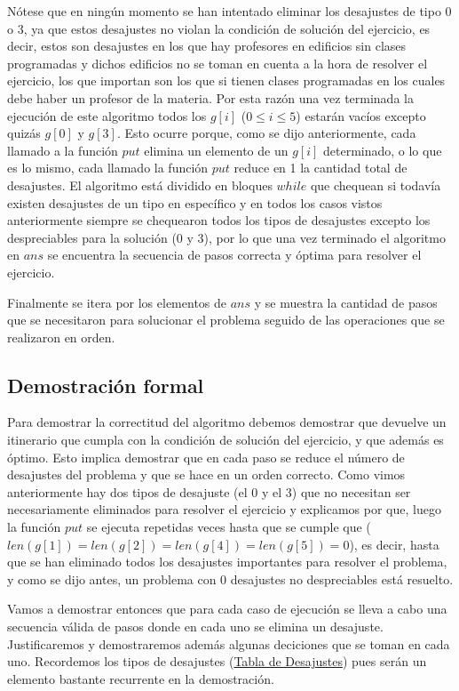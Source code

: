 \documentclass[11pt]{article}
\begin{document}
    Nótese que en ningún momento se han intentado eliminar los desajustes de tipo 0 o 3, ya que estos desajustes
    no violan la condición de solución del ejercicio, es decir, estos son desajustes en los que hay profesores en
    edificios sin clases programadas y dichos edificios no se toman en cuenta a la hora de resolver el ejercicio,
    los que importan son los que si tienen clases programadas en los cuales debe haber un profesor de la materia.
    Por esta razón una vez terminada la ejecución de este algoritmo todos los $g[i]$ ($0 \leq i \leq 5$) estarán
    vacíos excepto quizás $g[0]$ y $g[3]$. Esto ocurre porque, como se dijo anteriormente, cada llamado a la función
    $put$ elimina un elemento de un $g[i]$ determinado, o lo que es lo mismo, cada llamado la función $put$ reduce
    en 1 la cantidad total de desajustes. El algoritmo está dividido en bloques $while$ que chequean si todavía
    existen desajustes de un tipo en específico y en todos los casos vistos anteriormente siempre se chequearon todos
    los tipos de desajustes excepto los despreciables para la solución (0 y 3), por lo que una vez terminado el algoritmo
    en $ans$ se encuentra la secuencia de pasos correcta y óptima para resolver el ejercicio.

    Finalmente se itera por los elementos de $ans$ y se muestra la cantidad de pasos que se necesitaron para solucionar
    el problema seguido de las operaciones que se realizaron en orden.

    \subsection{Demostración formal}
    Para demostrar la correctitud del algoritmo debemos demostrar que devuelve un itinerario que cumpla con la condición de 
    solución del ejercicio, y que además es óptimo. Esto implica demostrar que en cada paso se reduce el número de desajustes 
    del problema y que se hace en un orden correcto. Como vimos anteriormente hay dos tipos de desajuste (el 0 y el 3) que no 
    necesitan ser necesariamente eliminados para resolver el ejercicio y explicamos por que, luego la función $put$ se ejecuta 
    repetidas veces hasta que se cumple que ($len(g[1]) = len(g[2]) = len(g[4]) = len(g[5]) = 0$), es decir, hasta que se han 
    eliminado todos los desajustes importantes para resolver el problema, y como se dijo antes, un problema con 0 desajustes 
    no despreciables está resuelto.

    Vamos a demostrar entonces que para cada caso de ejecución se lleva a cabo una secuencia válida de pasos donde en cada uno 
    se elimina un desajuste. Justificaremos y demostraremos además algunas deciciones que se toman en cada uno. Recordemos los 
    tipos de desajustes (\hyperref[Tabla_de_Desajustes]{Tabla de Desajustes}) pues serán un elemento bastante recurrente en la 
    demostración.
\end{document}
